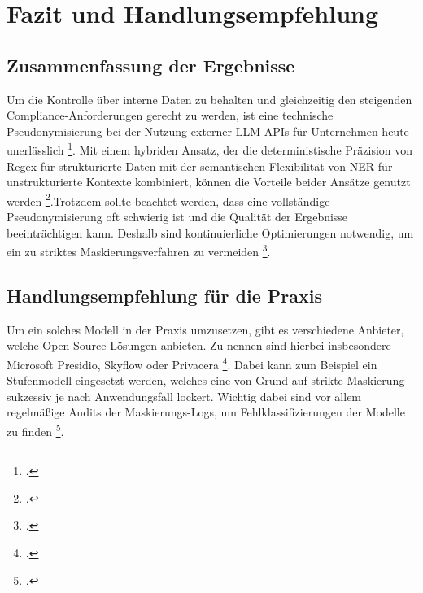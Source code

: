 \chapter{Fazit und Handlungsempfehlung}

\section{Zusammenfassung der Ergebnisse}
Um die Kontrolle über interne Daten zu behalten und gleichzeitig den steigenden Compliance-Anforderungen gerecht zu werden, ist eine technische Pseudonymisierung bei der Nutzung externer \ac{LLM}-\acp{API} für Unternehmen heute unerlässlich \footcite{staab2025sokprivacyparadox}. Mit einem hybriden Ansatz, der die deterministische Präzision von \ac{Regex} für strukturierte Daten mit der semantischen Flexibilität von \ac{NER} für unstrukturierte Kontexte kombiniert, können die Vorteile beider Ansätze genutzt werden \footcite{naseer2025recap}.Trotzdem sollte beachtet werden,
dass eine vollständige Pseudonymisierung oft schwierig ist und die
Qualität der Ergebnisse beeinträchtigen kann. Deshalb sind kontinuierliche Optimierungen notwendig, um ein zu striktes Maskierungsverfahren zu vermeiden \footcite{wang2025revisitingtradeoffs}.

\section{Handlungsempfehlung für die Praxis}
Um ein solches Modell in der Praxis umzusetzen, gibt es verschiedene Anbieter, welche Open-Source-Lösungen anbieten. Zu nennen sind hierbei insbesondere Microsoft Presidio, Skyflow oder Privacera \footcite{vignati2024towardsmiddleware}. Dabei kann zum Beispiel ein Stufenmodell eingesetzt werden, welches eine von Grund auf strikte Maskierung sukzessiv je nach Anwendungsfall lockert. Wichtig dabei sind vor allem regelmäßige Audits der Maskierungs-Logs, um Fehlklassifizierungen der Modelle zu finden \footcite{zhang2025surveyprivacypreservation}.